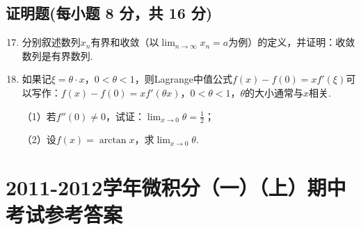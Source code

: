 \documentclass[../Main.tex]{subfiles}
\begin{document}
\section{证明题(每小题 8 分，共 16 分)}
\begin{enumerate}
    \setcounter{enumi}{16}
    \item 分别叙述数列$x_{n}$有界和收敛（以$\lim_{n\to\infty}x_{n}=a$为例）的定义，并证明：收敛数列是有界数列.
          \vspace{12em}

    \item 如果记$\xi=\theta\cdot x$，$0<\theta<1$，则Lagrange中值公式$f(x)-f
              (0)=xf'(\xi)$可以写作：$f(x)-f(0)=xf'(\theta x)$，$0<\theta<1$，$\theta$的大小通常与$x$相关.

          （1）若$f''(0)\neq0$，试证：$\lim_{x\to0}\theta=\frac{1}{2}$；

          （2）设$f(x)=\arctan x$，求$\lim_{x\to0}\theta$.
          \vspace{12em}
\end{enumerate}

\chapter{2011-2012学年微积分（一）（上）期中考试参考答案}
\end{document}
